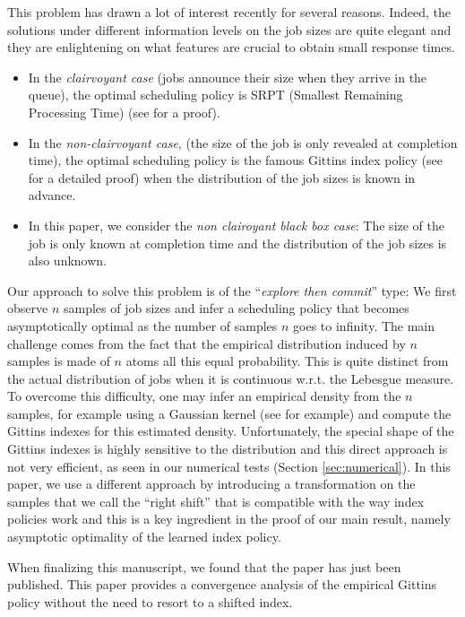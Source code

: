 \documentclass[11pt]{article}
\begin{document}
 This problem has drawn a lot of interest recently for several reasons. Indeed, the solutions under different information levels on the job sizes are quite elegant and they are enlightening on what features are crucial to obtain small response times.
 \begin{itemize}
 \item 
 In the {\it clairvoyant case} (jobs announce their size when they arrive in the
 queue), the optimal scheduling policy is SRPT (Smallest Remaining Processing Time) (see \cite{SRPT} for a proof).
 
 \item In the {\it non-clairvoyant case}, (the size of the job is only revealed at completion time), the optimal scheduling policy is the famous Gittins index policy (see \cite {Scully2021} for a detailed proof) when the  distribution of the job sizes is known in advance.


\item In this paper,  we consider the {\it non clairoyant black box case}: The size of the job is only known at completion time and the distribution of the job sizes is also unknown.

\end{itemize}

Our approach to solve this problem is  of the ``{\it explore then commit}'' type: We first  observe $n$ samples of job sizes and infer a scheduling policy that becomes asymptotically optimal as the number of samples $n$ goes to infinity.
 The main challenge comes from the fact that the empirical distribution induced by  $n$ samples  is made of $n$ atoms all this equal probability. This is quite distinct from the actual distribution of jobs when it is continuous  w.r.t. the Lebesgue measure.
 To overcome this difficulty, one may infer an empirical density from the $n$ samples, for example using a Gaussian kernel (see \cite{Rudemo} for example) and compute the Gittins indexes for this estimated density. Unfortunately, the special shape of the Gittins indexes is highly sensitive to the distribution and this direct approach is not very efficient, as seen in our numerical tests (Section \ref{sec:numerical}).
 In this paper, we use a different approach by introducing a transformation on the samples that we call the ``right shift'' that is compatible with the way index policies work and this is a key ingredient in the proof of our main result, namely asymptotic optimality of the learned index policy.

 
When finalizing this manuscript, we found that the paper \cite{ramakrishna2026empirical} has just been published.  This paper provides a convergence analysis of the empirical Gittins policy without the need to resort to a shifted index.
 
\end{document}
